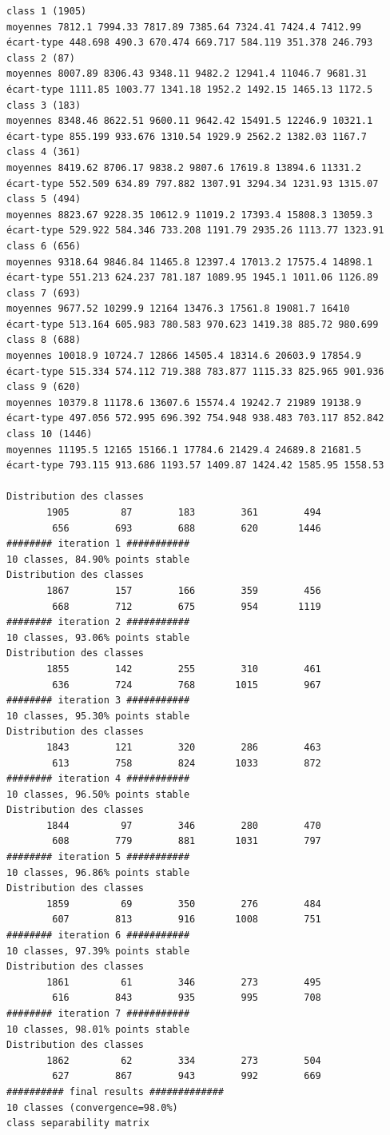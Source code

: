 \documentclass[land,article,submit,pdftex,moreauthors]{Definitions/mdpi}
\begin{document}
\begin{scriptsize}
\begin{verbatim}
class 1 (1905)
moyennes 7812.1 7994.33 7817.89 7385.64 7324.41 7424.4 7412.99
écart-type 448.698 490.3 670.474 669.717 584.119 351.378 246.793
class 2 (87)
moyennes 8007.89 8306.43 9348.11 9482.2 12941.4 11046.7 9681.31
écart-type 1111.85 1003.77 1341.18 1952.2 1492.15 1465.13 1172.5
class 3 (183)
moyennes 8348.46 8622.51 9600.11 9642.42 15491.5 12246.9 10321.1
écart-type 855.199 933.676 1310.54 1929.9 2562.2 1382.03 1167.7
class 4 (361)
moyennes 8419.62 8706.17 9838.2 9807.6 17619.8 13894.6 11331.2
écart-type 552.509 634.89 797.882 1307.91 3294.34 1231.93 1315.07
class 5 (494)
moyennes 8823.67 9228.35 10612.9 11019.2 17393.4 15808.3 13059.3
écart-type 529.922 584.346 733.208 1191.79 2935.26 1113.77 1323.91
class 6 (656)
moyennes 9318.64 9846.84 11465.8 12397.4 17013.2 17575.4 14898.1
écart-type 551.213 624.237 781.187 1089.95 1945.1 1011.06 1126.89
class 7 (693)
moyennes 9677.52 10299.9 12164 13476.3 17561.8 19081.7 16410
écart-type 513.164 605.983 780.583 970.623 1419.38 885.72 980.699
class 8 (688)
moyennes 10018.9 10724.7 12866 14505.4 18314.6 20603.9 17854.9
écart-type 515.334 574.112 719.388 783.877 1115.33 825.965 901.936
class 9 (620)
moyennes 10379.8 11178.6 13607.6 15574.4 19242.7 21989 19138.9
écart-type 497.056 572.995 696.392 754.948 938.483 703.117 852.842
class 10 (1446)
moyennes 11195.5 12165 15166.1 17784.6 21429.4 24689.8 21681.5
écart-type 793.115 913.686 1193.57 1409.87 1424.42 1585.95 1558.53

Distribution des classes
       1905         87        183        361        494
        656        693        688        620       1446
######## iteration 1 ###########
10 classes, 84.90% points stable
Distribution des classes
       1867        157        166        359        456
        668        712        675        954       1119
######## iteration 2 ###########
10 classes, 93.06% points stable
Distribution des classes
       1855        142        255        310        461
        636        724        768       1015        967
######## iteration 3 ###########
10 classes, 95.30% points stable
Distribution des classes
       1843        121        320        286        463
        613        758        824       1033        872
######## iteration 4 ###########
10 classes, 96.50% points stable
Distribution des classes
       1844         97        346        280        470
        608        779        881       1031        797
######## iteration 5 ###########
10 classes, 96.86% points stable
Distribution des classes
       1859         69        350        276        484
        607        813        916       1008        751
######## iteration 6 ###########
10 classes, 97.39% points stable
Distribution des classes
       1861         61        346        273        495
        616        843        935        995        708
######## iteration 7 ###########
10 classes, 98.01% points stable
Distribution des classes
       1862         62        334        273        504
        627        867        943        992        669
########## final results #############
10 classes (convergence=98.0%)
class separability matrix


\end{verbatim}
\end{scriptsize}
\end{document}
